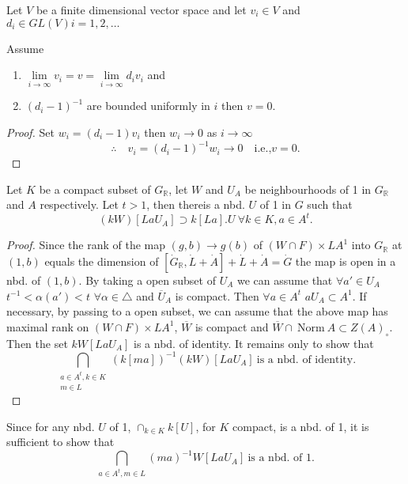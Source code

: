 \begin{lemma} \label{chap3:lem3.3}
  Let $V$ be a finite dimensional vector space and let $v_i \in V$ and
  $d_i \in GL (V) i = 1, 2, \ldots$
  
  Assume 
  \begin{enumerate}[\rm (i)]
    \item $\lim\limits_{i \to \infty} v_i = v = \lim\limits_{i \to
      \infty} d_i v_i$ and
      \item $(d_i-1)^{-1}$ are bounded uniformly in $i$ then $v=0$.
  \end{enumerate}
\end{lemma}

\begin{proof}
  Set $w_i = (d_i -1)v_i$ then $w_i \to 0$ as $i \to \infty$
  $$
  \therefore \quad v_i = (d_i-1)^{-1} w_i \to 0 \quad \text{i.e.,} v=0.
  $$
\end{proof}

\begin{lemma} \label{chap3:lem3.4}
  Let $K$ be a compact subset of $G_\mathbb{R}$, let $W$ and
  $U_A$ be neighbourhoods of 1 in $G_\mathbb{R}$ and $A$
  respectively. Let $t > 1$, then there\pageoriginale is a nbd. 
  $U$ of 1 in $G$ such   that
  $$
  (kW) [La U_A] \supset k [La]. U ~\forall k \in K, a \in A^t.
  $$
\end{lemma}

\begin{proof}
  Since the rank of the map $(g, b) \to g(b)$ of $(W \cap F) \times
  LA^1$ into $G_\mathbb{R}$ at $(1, b)$ equals the dimension of
  $[\dot{G}_\mathbb{R}, \dot{L}+ \dot{A}] + \dot{L} + \dot{A}=
  \dot{G}$ the map is open in a nbd. of $(1, b)$. By taking a open
  subset of $U_A$ we can assume that $\forall a' \in U_A$ $t^{-1} <
  \alpha (a') < t$ $\forall \alpha \in \triangle$ and $\overline{U}_A$
  is compact. Then $\forall a \in A^t$ $a U_A \subset A^1$. If
  necessary, by passing to a open subset, we can assume that the above
  map has maximal rank on $(W \cap F) \times LA^1$, $\overline{W}$ is
  compact and $\overline{W} \cap ~\text{Norm}~ A \subset
  Z(A)_\circ$. Then the set $kW [La U_A]$ is a nbd. of identity. It
  remains only to show that
  $$
  \bigcap_{\substack{a \in A^t, k \in K\\m \in L}} (k [ma])^{-1} (kW)
         [La U_A] ~\text{is a nbd. of identity}.
  $$
\end{proof}

Since for any nbd. $U$ of 1, $\displaystyle{\cap_{k \in K}} k [U]$, for
$K$ compact, is a nbd. of 1, it is sufficient to show that
\begin{equation*}
  \bigcap_{a \in A^t, m \in L} (ma)^{-1} W[La U_A] ~\text{is a nbd. of
    1}. \tag{*}\label{chap3:eq*} 
\end{equation*}

